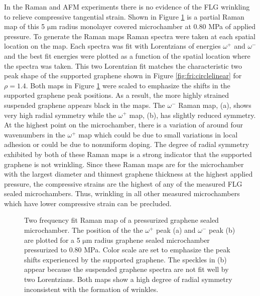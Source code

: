 In the Raman and AFM experiments there is no evidence of the FLG wrinkling to relieve compressive tangential strain.
Shown in Figure \ref{fig:fri:cylindrical} is a partial Raman map of this 5 $\mathrm{\mu}$m radius monolayer covered microchamber at 0.80 MPa of applied pressure.
To generate the Raman maps Raman spectra were taken at each spatial location on the map.
Each spectra was fit with Lorentzians of energies $\omega^+$ and $\omega^-$ and the best fit energies were plotted as a function of the spatial location where the spectra was taken.
This two Lorentzian fit matches the characteristic two peak shape of the supported graphene shown in Figure \ref{fig:fri:circlelinear} for $\rho=1.4$.
Both maps in Figure \ref{fig:fri:cylindrical} were scaled to emphasize the shifts in the supported graphene peak positions.
As a result, the more highly strained suspended graphene appears black in the maps.
The $\omega^-$ Raman map, (a), shows very high radial symmetry while the $\omega^+$ map, (b), has slightly reduced symmetry.
At the highest point on the microchamber, there is a variation of around four wavenumbers in the $\omega^+$ map which could be due to small variations in local adhesion or could be due to nonuniform doping.
The degree of radial symmetry exhibited by both of these Raman maps is a strong indicator that the supported graphene is not wrinkling.
Since these Raman maps are for the microchamber with the largest diameter and thinnest graphene thickness at the highest applied pressure, the compressive strains are the highest of any of the measured FLG sealed microchambers.
Thus, wrinkling in all other measured microchambers which have lower compressive strain can be precluded.

\begin{figure}
	\begin{center}
	
	\end{center}
	\caption[Raman map of pressurized graphene sealed microchamber]{\label{fig:fri:cylindrical}
	Two frequency fit Raman map of a pressurized graphene sealed microchamber.
	The position of the the $\omega^+$ peak (a) and $\omega^-$ peak (b) are plotted for a 5 $\mathrm{\mu}$m radius graphene sealed microchamber pressurized to 0.80 MPa.
	Color scale are set to emphasize the peak shifts experienced by the supported graphene.
	The speckles in (b) appear because the suspended graphene spectra are not fit well by two Lorentzians.
	Both maps show a high degree of radial symmetry inconsistent with the formation of wrinkles.
	}
\end{figure}

